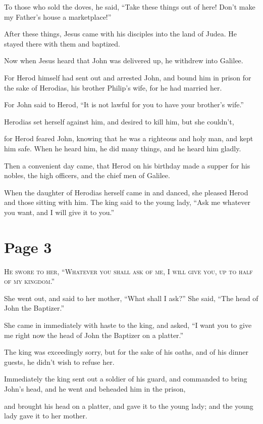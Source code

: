 To those who sold the doves, he said, “Take these things out of here! Don’t make my Father’s house a marketplace!”

After these things, Jesus came with his disciples into the land of Judea. He stayed there with them and baptized.

Now when Jesus heard that John was delivered up, he withdrew into Galilee.

For Herod himself had sent out and arrested John, and bound him in prison for the sake of Herodias, his brother Philip’s wife, for he had married her.

For John said to Herod, “It is not lawful for you to have your brother’s wife.”

Herodias set herself against him, and desired to kill him, but she couldn’t,

for Herod feared John, knowing that he was a righteous and holy man, and kept him safe. When he heard him, he did many things, and he heard him gladly.

Then a convenient day came, that Herod on his birthday made a supper for his nobles, the high officers, and the chief men of Galilee.

When the daughter of Herodias herself came in and danced, she pleased Herod and those sitting with him. The king said to the young lady, “Ask me whatever you want, and I will give it to you.”



\chapterornament
\section*{Page 3}

\lettrine{H}{e swore to her, “Whatever you shall ask of me, I will give you, up to half of my kingdom.”}

She went out, and said to her mother, “What shall I ask?” She said, “The head of John the Baptizer.”

She came in immediately with haste to the king, and asked, “I want you to give me right now the head of John the Baptizer on a platter.”

The king was exceedingly sorry, but for the sake of his oaths, and of his dinner guests, he didn’t wish to refuse her.

Immediately the king sent out a soldier of his guard, and commanded to bring John’s head, and he went and beheaded him in the prison,

and brought his head on a platter, and gave it to the young lady; and the young lady gave it to her mother.

